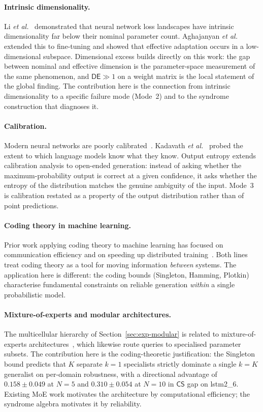 \documentclass[11pt,a4paper]{article}
\newcommand{\CS}{\mathsf{CS}}
\newcommand{\DE}{\mathsf{DE}}
\begin{document}
\paragraph{Intrinsic dimensionality.} Li \textit{et al.}~\cite{Li2018}
demonstrated that neural network loss landscapes have intrinsic dimensionality far below their nominal parameter count. Aghajanyan \textit{et al.}~\cite{Aghajanyan2021} extended this to fine-tuning and showed that effective adaptation occurs in a low-dimensional subspace. Dimensional excess builds directly on this work: the gap between nominal and effective dimension is the parameter-space measurement of the same phenomenon, and $\DE \gg 1$ on a weight matrix is the local statement of the global finding. The contribution here is the connection from intrinsic dimensionality to a specific failure mode (Mode~2) and to the syndrome construction that diagnoses it.

\paragraph{Calibration.} Modern neural networks are poorly
calibrated~\cite{Guo2017}. Kadavath \textit{et al.}~\cite{Kadavath2022} probed the extent to which language models know what they know. Output entropy extends calibration analysis to open-ended generation: instead of asking whether the maximum-probability output is correct at a given confidence, it asks whether the entropy of the distribution matches the genuine ambiguity of the input. Mode~3 is calibration restated as a property of the output distribution rather than of point predictions.

\paragraph{Coding theory in machine learning.} Prior work applying coding theory to machine learning has focused on communication efficiency \cite{Alistarh2017} and on speeding up distributed training~\cite{Lee2018}. Both lines treat coding theory as a tool for moving information \emph{between} systems. The application here is different: the coding bounds (Singleton, Hamming, Plotkin) characterise fundamental constraints on reliable generation \emph{within} a single probabilistic model.

\paragraph{Mixture-of-experts and modular architectures.} The multicellular hierarchy of Section~\ref{sec:exp-modular} is related to mixture-of-experts architectures~\cite{Shazeer2017, Fedus2022}, which likewise route queries to specialised parameter subsets. The contribution here is the coding-theoretic justification: the Singleton bound predicts that $K$ separate $k = 1$ specialists strictly dominate a single $k = K$ generalist on per-domain robustness, with a directional advantage of $0.158 \pm 0.049$ at $N = 5$ and $0.310 \pm 0.054$ at $N = 10$ in $\CS$ gap on lstm2\_6. Existing MoE work motivates the architecture by computational efficiency; the syndrome algebra motivates it by reliability.
\end{document}
